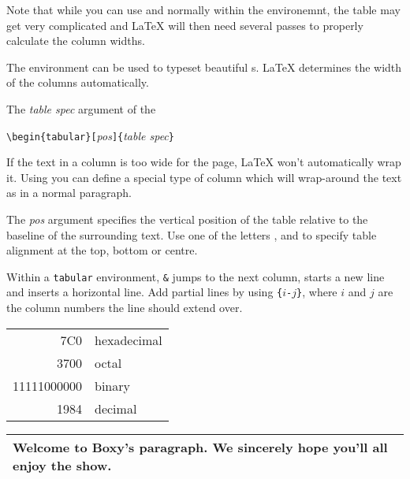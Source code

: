 Note that while you can use  and  normally within
the  environemnt, the table may get very complicated and \LaTeX{}
will then need several passes to properly calculate the column widths.

The  environment can be used to typeset beautiful s.
\LaTeX{} determines the width of the columns automatically.

The \emph{table spec} argument of the
\begin{lscommand}
\verb|\begin{tabular}[|\emph{pos}\verb|]{|\emph{table spec}\verb|}|
\end{lscommand}
\noindent 

If the text in a column is too wide for the page, \LaTeX{} won't
automatically wrap it. Using  you can define
a special type of column which will wrap-around the text as in a normal paragraph.

The \emph{pos} argument specifies the vertical position of the table
relative to the baseline of the surrounding text.  Use one of the
letters ,  and  to specify table
alignment at the top, bottom or centre.

Within a \texttt{tabular} environment, \texttt{\&} jumps to the next
column, \ci{\bs} starts a new line and  inserts a horizontal
line.  Add partial lines by using \texttt{\{}$i$\texttt{-}$j$\texttt{\}},
where $i$ and $j$ are the column numbers the line should extend over.


\begin{example}
\begin{tabular}{|r|l|}
\hline
7C0 & hexadecimal \\
3700 & octal \\ \cline{2-2}
11111000000 & binary \\
\hline \hline
1984 & decimal \\
\hline
\end{tabular}
\end{example}

\begin{example}
\begin{tabular}{|p{4.7cm}|}
\hline
Welcome to Boxy's paragraph.
We sincerely hope you'll
all enjoy the show.\\
\hline
\end{tabular}
\end{example}

